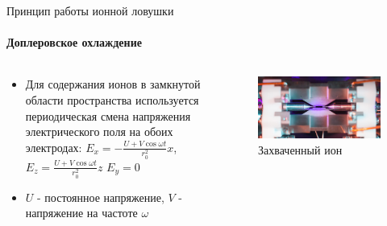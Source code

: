 \documentclass{beamer}
\begin{document}
    \begin{frame}{Принцип работы ионной ловушки}
    \framesubtitle{Доплеровское охлаждение}


        \begin{columns}

        \begin{column}{0.5\textwidth}

            \begin{itemize}
                \item<2-> Для содержания ионов в замкнутой области пространства используется
                      периодическая смена напряжения электрического поля на обоих электродах:
                      $E_x = - \frac{U + V \cos{\omega t}}{r_{0}^2} x$,
                      $E_z = \frac{U + V \cos{\omega t}}{r_{0}^2} z$
                      $E_y = 0$
                \item<2-> $U$ - постоянное напряжение, $V$ - напряжение на частоте $\omega$
            \end{itemize}

        \end{column}

        \begin{column}{0.5\textwidth}
            \begin{figure}
                \centering
                \includegraphics[width=\textwidth]{media/trapped-ion.jpg}
                \caption{Захваченный ион}
            \end{figure}
        \end{column}

        \end{columns}
    \end{frame}
\end{document}
